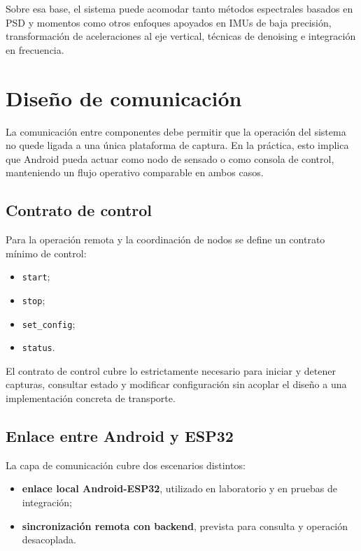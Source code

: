 Sobre esa base, el sistema puede acomodar tanto métodos espectrales basados en PSD y momentos como otros enfoques apoyados en IMUs de baja precisión, transformación de aceleraciones al eje vertical, técnicas de denoising e integración en frecuencia.

\section{Diseño de comunicación}

La comunicación entre componentes debe permitir que la operación del sistema no quede ligada a una única plataforma de captura. En la práctica, esto implica que Android pueda actuar como nodo de sensado o como consola de control, manteniendo un flujo operativo comparable en ambos casos.

\subsection{Contrato de control}

Para la operación remota y la coordinación de nodos se define un contrato mínimo de control:

\begin{itemize}
  \item \texttt{start};
  \item \texttt{stop};
  \item \texttt{set\_config};
  \item \texttt{status}.
\end{itemize}

El contrato de control cubre lo estrictamente necesario para iniciar y detener capturas, consultar estado y modificar configuración sin acoplar el diseño a una implementación concreta de transporte.

\label{fig:placeholder-secuencia-operacion-remota}

\subsection{Enlace entre Android y ESP32}

La capa de comunicación cubre dos escenarios distintos:

\begin{itemize}
  \item \textbf{enlace local Android-ESP32}, utilizado en laboratorio y en pruebas de integración;
  \item \textbf{sincronización remota con backend}, prevista para consulta y operación desacoplada.
\end{itemize}

